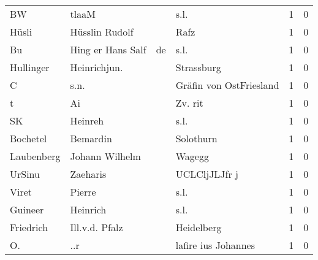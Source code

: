\documentclass[10pt,a4paper,landscape]{article}
\begin{document}
\begin{longtable}{llllrr}
                       BW &                              tlaaM &             &                                        s.l. &          1 &         0 \\
                    Hüsli &                     Hüsslin Rudolf &             &                                        Rafz &          1 &         0 \\
                       Bu &                  Hing er Hans Salf &          de &                                        s.l. &          1 &         0 \\
                Hullinger &                       Heinrichjun. &             &                                  Strassburg &          1 &         0 \\
                        C &                               s.n. &             &                     Gräfin von OstFriesland &          1 &         0 \\
                        t &                                 Ai &             &                                     Zv. rit &          1 &         0 \\
                       SK &                            Heinreh &             &                                        s.l. &          1 &         0 \\
                 Bochetel &                           Bemardin &             &                                   Solothurn &          1 &         0 \\
               Laubenberg &                     Johann Wilhelm &             &                                      Wagegg &          1 &         0 \\
                   UrSinu &                           Zaeharis &             &                               UCLCljJLJfr j &          1 &         0 \\
                    Viret &                             Pierre &             &                                        s.l. &          1 &         0 \\
                  Guineer &                           Heinrich &             &                                        s.l. &          1 &         0 \\
                Friedrich &                     Ill.v.d. Pfalz &             &                                  Heidelberg &          1 &         0 \\
                       O. &                                ..r &             &                         lafire ius Johannes &          1 &         0 \\

\end{longtable}
\end{document}
